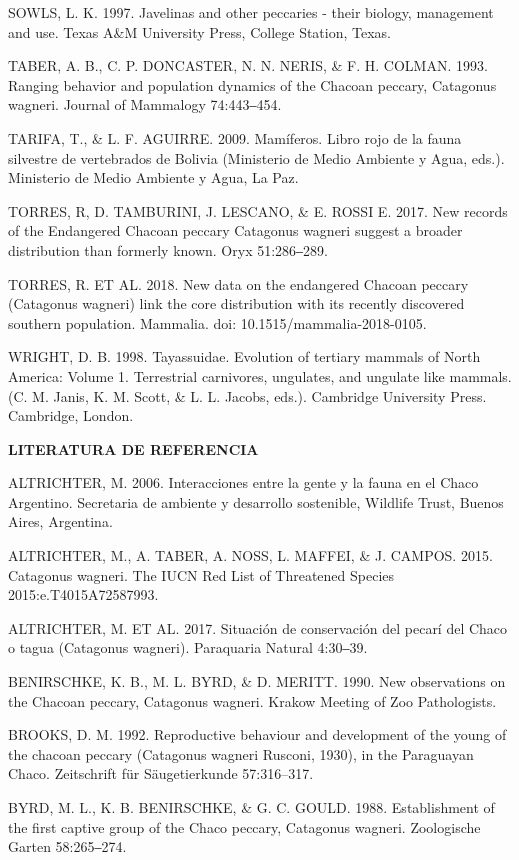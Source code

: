\documentclass[
  x11names]{article}
\begin{document}
SOWLS, L. K. 1997. Javelinas and other peccaries - their biology,
management and use. Texas A\&M University Press, College Station, Texas.

TABER, A. B., C. P. DONCASTER, N. N. NERIS, \& F. H. COLMAN. 1993.
Ranging behavior and population dynamics of the Chacoan peccary,
Catagonus wagneri. Journal of Mammalogy 74:443‒454.

TARIFA, T., \& L. F. AGUIRRE. 2009. Mamíferos. Libro rojo de la fauna
silvestre de vertebrados de Bolivia (Ministerio de Medio Ambiente y
Agua, eds.). Ministerio de Medio Ambiente y Agua, La Paz.

TORRES, R, D. TAMBURINI, J. LESCANO, \& E. ROSSI E. 2017. New records of
the Endangered Chacoan peccary Catagonus wagneri suggest a broader
distribution than formerly known. Oryx 51:286‒289.

TORRES, R. ET AL. 2018. New data on the endangered Chacoan peccary
(Catagonus wagneri) link the core distribution with its recently
discovered southern population. Mammalia. doi:
10.1515/mammalia-2018-0105.~

WRIGHT, D. B. 1998. Tayassuidae. Evolution of tertiary mammals of North
America: Volume 1. Terrestrial carnivores, ungulates, and ungulate like
mammals. (C. M. Janis, K. M. Scott, \& L. L. Jacobs, eds.). Cambridge
University Press. Cambridge, London.

\noindent\textbf{LITERATURA DE REFERENCIA}

ALTRICHTER, M. 2006. Interacciones entre la gente y la fauna en el Chaco
Argentino. Secretaria de ambiente y desarrollo sostenible, Wildlife
Trust, Buenos Aires, Argentina.

ALTRICHTER, M., A. TABER, A. NOSS, L. MAFFEI, \& J. CAMPOS. 2015.
Catagonus wagneri. The IUCN Red List of Threatened Species
2015:e.T4015A72587993.

ALTRICHTER, M. ET AL. 2017. Situación de conservación del pecarí del
Chaco o tagua (Catagonus wagneri). Paraquaria Natural 4:30‒39.

BENIRSCHKE, K. B., M. L. BYRD, \& D. MERITT. 1990. New observations on
the Chacoan peccary, Catagonus wagneri. Krakow Meeting of Zoo
Pathologists.

BROOKS, D. M. 1992. Reproductive behaviour and development of the young
of the chacoan peccary (Catagonus wagneri Rusconi, 1930), in the
Paraguayan Chaco. Zeitschrift für Säugetierkunde 57:316--317.

BYRD, M. L., K. B. BENIRSCHKE, \& G. C. GOULD. 1988. Establishment of
the first captive group of the Chaco peccary, Catagonus wagneri.
Zoologische Garten 58:265‒274.
\end{document}
